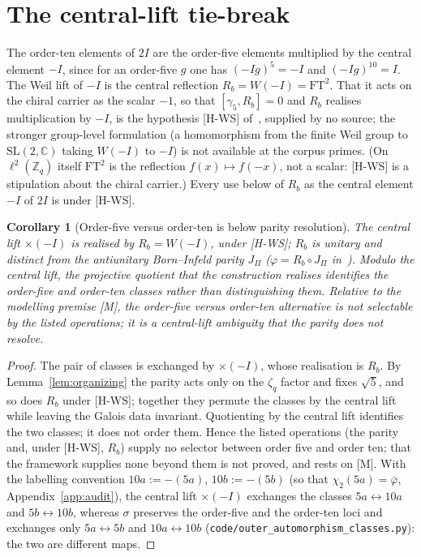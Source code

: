 \documentclass[11pt]{article}
\newtheorem{corollary}{Corollary}
\theoremstyle{definition}
\theoremstyle{remark}
\begin{document}
  \section{The central-lift tie-break}
    \label{sec:tiebreak}

    The order-ten elements of $2I$ are the order-five elements multiplied by the central element $-I$, since for an
    order-five $g$ one has $(-Ig)^{5}=-I$ and $(-Ig)^{10}=I$.
    The Weil lift of $-I$ is the central reflection $R_b=W(-I)=\mathrm{FT}^{2}$.
    That it acts on the chiral carrier as the scalar $-1$, so that $[\gamma_5,R_b]=0$ and $R_b$ realises multiplication
    by $-I$, is the hypothesis [H-WS] of~\cite{Beau2026q11of}, supplied by no source; the stronger group-level formulation (a homomorphism from the
    finite Weil group to $\mathrm{SL}(2,\mathbb{C})$ taking $W(-I)$ to $-I$) is not available at the corpus primes.
    (On $\ell^2(\mathbb{Z}_q)$ itself $\mathrm{FT}^2$ is the reflection $f(x)\mapsto f(-x)$, not a scalar: [H-WS] is a
    stipulation about the chiral carrier.)
    Every use below of $R_b$ as the central element $-I$ of $2I$ is under [H-WS].

    \begin{corollary}[Order-five versus order-ten is below parity resolution]
      \label{cor:tiebreak}
      The central lift $\times(-I)$ is realised by $R_b=W(-I)$, under [H-WS]; $R_b$ is unitary and distinct from the
      antiunitary Born--Infeld parity $J_\Pi$ ($\varphi=R_b\circ J_\Pi$ in~\cite{Beau2026q11of}).
      Modulo the central lift, the projective quotient that the construction realises identifies the order-five and order-ten classes rather than distinguishing them.
            Relative to the modelling premise [M], the order-five versus order-ten alternative is not selectable by the
      listed operations; it is a central-lift ambiguity that the parity does not resolve.
    \end{corollary}

    \begin{proof}
      The pair of classes is exchanged by $\times(-I)$, whose realisation is $R_b$.
      By Lemma~\ref{lem:organizing} the parity acts only on the $\zeta_q$ factor and fixes $\sqrt{5}$, and so does $R_b$
      under [H-WS]; together they permute the classes by the central lift while leaving the Galois data invariant.
      Quotienting by the central lift identifies the two classes; it does not order them.
            Hence the listed operations (the parity and, under [H-WS], $R_b$) supply no selector between order five and order
      ten; that the framework supplies none beyond them is not proved, and rests on [M].
      With the labelling convention $10a:=-(5a)$, $10b:=-(5b)$ (so that $\chi_2(5a)=\bar\varphi$, Appendix~\ref{app:audit}),
      the central lift $\times(-I)$ exchanges the classes $5a\leftrightarrow10a$ and $5b\leftrightarrow10b$, whereas $\sigma$
      preserves the order-five and the order-ten loci and exchanges only $5a\leftrightarrow5b$ and $10a\leftrightarrow10b$
      (\texttt{code/outer\_automorphism\_classes.py}): the two are different maps.
    \end{proof}
\end{document}
